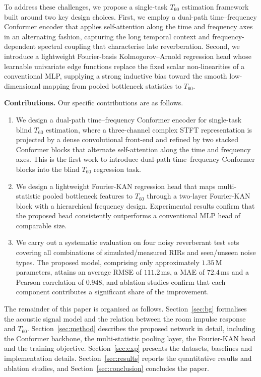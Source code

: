 \documentclass[a4paper,fleqn]{cas-sc}
\begin{document}
To address these challenges, we propose a single-task $T_{60}$ estimation
framework built around two key design choices. First, we employ a
dual-path time--frequency Conformer encoder that applies self-attention
along the time and frequency axes in an alternating fashion, capturing
the long temporal context and frequency-dependent spectral coupling that
characterise late reverberation. Second, we introduce a lightweight
Fourier-basis Kolmogorov--Arnold regression head whose learnable
univariate edge functions replace the fixed scalar non-linearities of a
conventional MLP, supplying a strong inductive bias toward the smooth
low-dimensional mapping from pooled bottleneck statistics to $T_{60}$.

\noindent\textbf{Contributions.} Our specific contributions are as
follows.

\begin{enumerate}[(1)]
  \item We design a dual-path time--frequency Conformer encoder for
        single-task blind $T_{60}$ estimation, where a three-channel
        complex STFT representation is projected by a dense convolutional
        front-end and refined by two stacked Conformer blocks that
        alternate self-attention along the time and frequency axes.
        This is the first work to introduce dual-path time--frequency
        Conformer blocks into the blind $T_{60}$ regression task.
  \item We design a lightweight Fourier-KAN regression head that maps
        multi-statistic pooled bottleneck features to $T_{60}$ through
        a two-layer Fourier-KAN block with a hierarchical frequency
        design. Experimental results confirm that the proposed head
        consistently outperforms a conventional MLP head of comparable
        size.
  \item We carry out a systematic evaluation on four noisy reverberant
        test sets covering all combinations of simulated/measured RIRs
        and seen/unseen noise types. The proposed model, comprising
        only approximately $1.35$\,M parameters, attains an average
        RMSE of $111.2$\,ms, a MAE of $72.4$\,ms and a Pearson
        correlation of $0.948$, and ablation studies confirm that each
        component contributes a significant share of the improvement.
\end{enumerate}

The remainder of this paper is organised as follows. Section~\ref{sec:bg}
formalises the acoustic signal model and the relation between the room
impulse response and $T_{60}$. Section~\ref{sec:method}
describes the proposed network in detail, including the Conformer
backbone, the multi-statistic pooling layer, the Fourier-KAN head and
the training objective. Section~\ref{sec:exp} presents the datasets, baselines and
implementation details. Section~\ref{sec:results} reports the
quantitative results and ablation studies, and Section~\ref{sec:conclusion}
concludes the paper.
\end{document}
